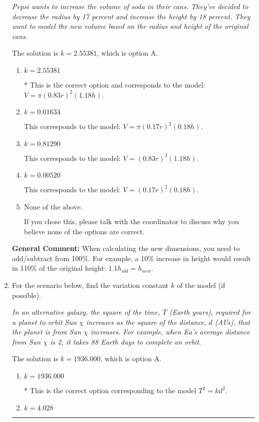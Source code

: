 \documentclass{extbook}[14pt]
\newcommand{\litem}[1]{\item #1

\rule{\textwidth}{0.4pt}}
\begin{document}
\begin{enumerate}
{\begin{center}
    \textit{ Pepsi wants to increase the volume of soda in their cans. They've decided to decrease the radius by 17 percent and increase the height by 18 percent. They want to model the new volume based on the radius and height of the original cans. }
\end{center}
The solution is \( k = 2.55381 \), which is option A.\begin{enumerate}[label=\Alph*.]
\item \( k = 2.55381 \)

* This is the correct option and corresponds to the model: $V = \pi (0.83 r)^2 (1.18 h)$.
\item \( k = 0.01634 \)

This corresponds to the model: $V = \pi (0.17 r)^2 (0.18 h)$.
\item \( k = 0.81290 \)

This corresponds to the model: $V = (0.83 r)^2 (1.18 h)$.
\item \( k = 0.00520 \)

This corresponds to the model: $V = (0.17 r)^2 (0.18 h)$.
\item \( \text{None of the above.} \)

If you chose this, please talk with the coordinator to discuss why you believe none of the options are correct.
\end{enumerate}

\textbf{General Comment:} When calculating the new dimensions, you need to add/subtract from 100\%. For example, a 10\% increase in height would result in 110\% of the original height: $1.1h_{old} = h_{new}$.
}
\litem{
For the scenario below, find the variation constant $k$ of the model (if possible).

\begin{center}
    \textit{ In an alternative galaxy, the square of the time, $T$ (Earth years), required for a planet to orbit Sun $\chi$ increases as the square of the distance, $d$ (AUs), that the planet is from Sun $\chi$ increases. For example, when Ea's average distance from Sun $\chi$ is 2, it takes 88 Earth days to complete an orbit. }
\end{center}
The solution is \( k = 1936.000 \), which is option A.\begin{enumerate}[label=\Alph*.]
\item \( k = 1936.000 \)

* This is the correct option corresponding to the model $T^{2} = k d^{2}$.
\item \( k = 4.028 \)


\end{enumerate}}
\end{enumerate}
\end{document}
